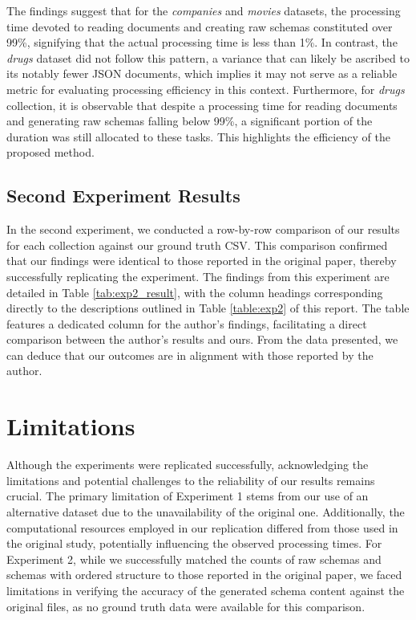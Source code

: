\documentclass[sigconf, nonacm]{acmart}
\begin{document}
The findings suggest that for the \textit{companies} and \textit{movies} datasets, the processing time devoted to reading documents and creating raw schemas constituted over 99\%, signifying that the actual processing time is less than 1\%. In contrast, the \textit{drugs} dataset did not follow this pattern, a variance that can likely be ascribed to its notably fewer JSON documents, which implies it may not serve as a reliable metric for evaluating processing efficiency in this context. Furthermore, for \textit{drugs} collection, it is observable that despite a processing time for reading documents and generating raw schemas falling below 99\%, a significant portion of the duration was still allocated to these tasks. This highlights the efficiency of the proposed method.

\subsection{Second Experiment Results}
In the second experiment, we conducted a row-by-row comparison of our results for each collection against our ground truth CSV. This comparison confirmed that our findings were identical to those reported in the original paper, thereby successfully replicating the experiment. The findings from this experiment are detailed in Table \ref{tab:exp2_result}, with the column headings corresponding directly to the descriptions outlined in Table \ref{table:exp2} of this report. The table features a dedicated column for the author's findings, facilitating a direct comparison between the author's results and ours. From the data presented, we can deduce that our outcomes are in alignment with those reported by the author.



\section{Limitations}
Although the experiments were replicated successfully, acknowledging the limitations and potential challenges to the reliability of our results remains crucial. The primary limitation of Experiment 1 stems from our use of an alternative dataset due to the unavailability of the original one. Additionally, the computational resources employed in our replication differed from those used in the original study, potentially influencing the observed processing times. For Experiment 2, while we successfully matched the counts of raw schemas and schemas with ordered structure to those reported in the original paper, we faced limitations in verifying the accuracy of the generated schema content against the original files, as no ground truth data were available for this comparison.
\end{document}
